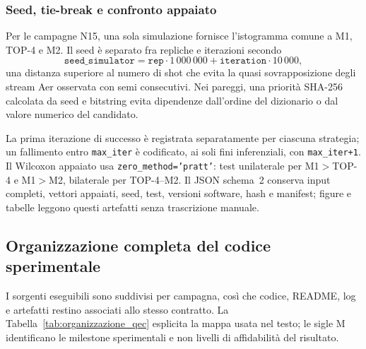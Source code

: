 \begin{onehalfspace}
\subsubsection{Seed, tie-break e confronto appaiato}

Per le campagne N15, una sola simulazione fornisce l'istogramma comune a M1, TOP-4 e M2.
Il seed è separato fra repliche e iterazioni secondo
\begin{equation}
\texttt{seed\_simulator}=\texttt{rep}\cdot1\,000\,000+
\texttt{iteration}\cdot10\,000,
\end{equation}
una distanza superiore al numero di shot che evita la quasi sovrapposizione degli stream
Aer osservata con semi consecutivi. Nei pareggi, una priorità SHA-256 calcolata da seed e
bitstring evita dipendenze dall'ordine del dizionario o dal valore numerico del candidato.

La prima iterazione di successo è registrata separatamente per ciascuna strategia; un
fallimento entro \texttt{max\_iter} è codificato, ai soli fini inferenziali, con
\texttt{max\_iter+1}. Il Wilcoxon appaiato usa
\texttt{zero\_method='pratt'}: test unilaterale per M1$>$TOP-4 e M1$>$M2, bilaterale
per TOP-4--M2. Il JSON schema~2 conserva input completi, vettori appaiati, seed, test,
versioni software, hash e manifest; figure e tabelle leggono questi artefatti senza
trascrizione manuale.

\subsection{Organizzazione completa del codice sperimentale}
\label{app:organizzazione_codice}

I sorgenti eseguibili sono suddivisi per campagna, così che codice, README, log e
artefatti restino associati allo stesso contratto. La Tabella~\ref{tab:organizzazione_qec}
esplicita la mappa usata nel testo; le sigle M identificano le milestone sperimentali e
non livelli di affidabilità del risultato.


\end{onehalfspace}
